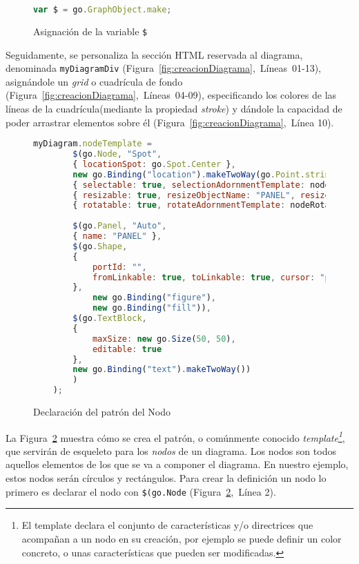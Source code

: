 \begin{figure}[!tb]
	\centering
	\begin{lstlisting}[language=JavaScript]
	var $ = go.GraphObject.make;
	\end{lstlisting}
	\caption{Asignación de la variable \texttt{\$}}
	\label{fig:asignacionDollar}
\end{figure}

Seguidamente, se personaliza la sección HTML reservada al diagrama, denominada \texttt{myDiagramDiv} (Figura~\ref{fig:creacionDiagrama},~Líneas~01-13), asignándole un \emph{grid} o cuadrícula de fondo (Figura~\ref{fig:creacionDiagrama},~Líneas~04-09), especificando los colores de las líneas de la cuadrícula(mediante la propiedad \emph{stroke})  y dándole la capacidad de poder arrastrar elementos sobre él (Figura~\ref{fig:creacionDiagrama},~Línea 10).

\begin{figure}[!tb]
	\centering
	\begin{lstlisting}[language=JavaScript]
	myDiagram.nodeTemplate =
		$(go.Node, "Spot",
		{ locationSpot: go.Spot.Center },
		new go.Binding("location").makeTwoWay(go.Point.stringify),
		{ selectable: true, selectionAdornmentTemplate: nodeSelectionAdornmentTemplate },
		{ resizable: true, resizeObjectName: "PANEL", resizeAdornmentTemplate: nodeResizeAdornmentTemplate },
		{ rotatable: true, rotateAdornmentTemplate: nodeRotateAdornmentTemplate },
	
		$(go.Panel, "Auto",
		{ name: "PANEL" },
		$(go.Shape,  
		{
			portId: "", 
			fromLinkable: true, toLinkable: true, cursor: "pointer",
		},
			new go.Binding("figure"),
			new go.Binding("fill")),
		$(go.TextBlock,
		{
			maxSize: new go.Size(50, 50),
			editable: true
		},
		new go.Binding("text").makeTwoWay())
		)
	);
	\end{lstlisting}
\caption{Declaración del patrón del Nodo}
\label{fig:patronNodo}
\end{figure}

La Figura~\ref{fig:patronNodo} muestra cómo se crea el patrón, o comúnmente conocido \emph{template\footnote{El template declara el conjunto de características y/o directrices que acompañan a un nodo en su creación, por ejemplo se puede definir un color concreto, o unas características que pueden ser modificadas.}}, que servirán de esqueleto para los \emph{nodos} de un diagrama. Los nodos son todos aquellos elementos de los que se va a componer el diagrama. En nuestro ejemplo, estos nodos serán círculos y rectángulos. Para crear la definición un nodo lo primero es declarar el nodo con \texttt{\$(go.Node} (Figura~\ref{fig:patronNodo},~Línea 2). 

